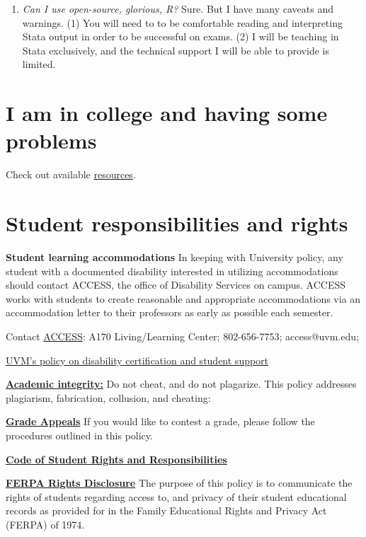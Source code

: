 \documentclass[
]{article}
\providecommand{\tightlist}{%
  \setlength{\itemsep}{0pt}\setlength{\parskip}{0pt}}
\begin{document}
\begin{enumerate}
\def\labelenumi{\arabic{enumi}.}
\tightlist
\item
  \emph{Can I use open-source, glorious, R?} Sure. But I have many
  caveats and warnings. (1) You will need to to be comfortable reading
  and interpreting Stata output in order to be successful on exams. (2)
  I will be teaching in Stata exclusively, and the technical support I
  will be able to provide is limited.
\end{enumerate}

\hypertarget{i-am-in-college-and-having-some-problems}{%
\section{\texorpdfstring{\protect\hypertarget{i-am-having-some-problems}{}{I
am in college and having some
problems}}{I am in college and having some problems}}\label{i-am-in-college-and-having-some-problems}}

Check out available \href{/bonus/ihaveproblems}{resources}.

\hypertarget{student-responsibilities-and-rights}{%
\section*{Student responsibilities and
rights}\label{student-responsibilities-and-rights}}

\textbf{Student learning accommodations} In keeping with University
policy, any student with a documented disability interested in utilizing
accommodations should contact ACCESS, the office of Disability Services
on campus. ACCESS works with students to create reasonable and
appropriate accommodations via an accommodation letter to their
professors as early as possible each semester.

Contact \href{http://www.uvm.edu}{ACCESS}: A170 Living/Learning Center;
802-656-7753; access@uvm.edu;

\href{http://www.uvm.edu/~uvmppg/ppg/student/disability.pdf}{UVM's
policy on disability certification and student support}

\href{http://www.uvm.edu/~uvmppg/ppg/student/acadintegrity.pdf}{\textbf{Academic
integrity:}} Do not cheat, and do not plagarize. This policy addresses
plagiarism, fabrication, collusion, and cheating:

\href{http://www.uvm.edu/~uvmppg/ppg/student/gradeappeals.pdf}{\textbf{Grade
Appeals}} If you would like to contest a grade, please follow the
procedures outlined in this policy.

\href{http://www.uvm.edu/~uvmppg/ppg/student/studentcode.pdf}{\textbf{Code
of Student Rights and Responsibilities}}

\href{http://www.uvm.edu/~uvmppg/ppg/student/ferpa.pdf}{\textbf{FERPA
Rights Disclosure}} The purpose of this policy is to communicate the
rights of students regarding access to, and privacy of their student
educational records as provided for in the Family Educational Rights and
Privacy Act (FERPA) of 1974.
\end{document}
